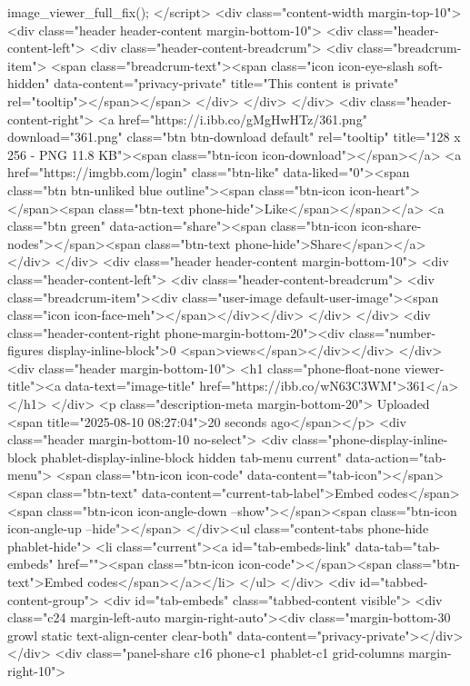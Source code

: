 image_viewer_full_fix();
</script>
<div class="content-width margin-top-10">
<div class="header header-content margin-bottom-10">
<div class="header-content-left">
<div class="header-content-breadcrum">
<div class="breadcrum-item">
<span class="breadcrum-text"><span class="icon icon-eye-slash soft-hidden" data-content="privacy-private" title="This content is private" rel="tooltip"></span></span>
</div>
</div>
</div>
<div class="header-content-right">
<a href="https://i.ibb.co/gMgHwHTz/361.png" download="361.png" class="btn btn-download default" rel="tooltip" title="128 x 256 - PNG 11.8 KB"><span class="btn-icon icon-download"></span></a>
<a href="https://imgbb.com/login" class="btn-like" data-liked="0"><span class="btn btn-unliked blue outline"><span class="btn-icon icon-heart"></span><span class="btn-text phone-hide">Like</span></span></a>
<a class="btn green" data-action="share"><span class="btn-icon icon-share-nodes"></span><span class="btn-text phone-hide">Share</span></a>
</div>
</div>
<div class="header header-content margin-bottom-10">
<div class="header-content-left">
<div class="header-content-breadcrum">
<div class="breadcrum-item"><div class="user-image default-user-image"><span class="icon icon-face-meh"></span></div></div>
</div>
</div>
<div class="header-content-right phone-margin-bottom-20"><div class="number-figures display-inline-block">0 <span>views</span></div></div>
</div>
<div class="header margin-bottom-10">
<h1 class="phone-float-none viewer-title"><a data-text="image-title" href="https://ibb.co/wN63C3WM">361</a></h1>
</div>
<p class="description-meta margin-bottom-20">
Uploaded <span title="2025-08-10 08:27:04">20 seconds ago</span></p>
<div class="header margin-bottom-10 no-select">
<div class="phone-display-inline-block phablet-display-inline-block hidden tab-menu current" data-action="tab-menu">
<span class="btn-icon icon-code" data-content="tab-icon"></span><span class="btn-text" data-content="current-tab-label">Embed codes</span><span class="btn-icon icon-angle-down --show"></span><span class="btn-icon icon-angle-up --hide"></span>
</div><ul class="content-tabs phone-hide phablet-hide">
<li class="current"><a id="tab-embeds-link" data-tab="tab-embeds" href=""><span class="btn-icon icon-code"></span><span class="btn-text">Embed codes</span></a></li>
</ul>
</div>
<div id="tabbed-content-group">
<div id="tab-embeds" class="tabbed-content visible">
<div class="c24 margin-left-auto margin-right-auto"><div class="margin-bottom-30 growl static text-align-center clear-both" data-content="privacy-private"></div></div>
<div class="panel-share c16 phone-c1 phablet-c1 grid-columns margin-right-10">
